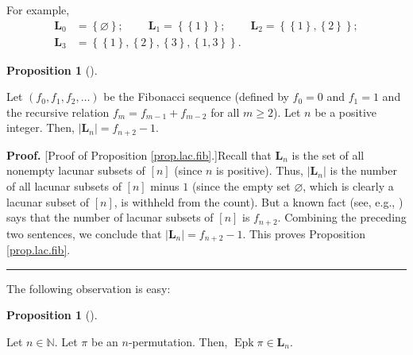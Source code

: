 \documentclass[numbers=enddot,12pt,final,onecolumn,notitlepage]{scrartcl}%
\theoremstyle{definition}
\newtheorem{prop}[theo]{Proposition}
\newenvironment{proposition}[1][]
{\begin{prop}[#1]\begin{leftbar}}
{\end{leftbar}\end{prop}}
\newenvironment{proof}[1][Proof]{\noindent\textbf{#1.} }{\ \rule{0.5em}{0.5em}}
\begin{document}
For example,%
\begin{align*}
\mathbf{L}_{0}  &  =\left\{  \varnothing\right\}
;\ \ \ \ \ \ \ \ \ \ \mathbf{L}_{1}=\left\{  \left\{  1\right\}  \right\}
;\ \ \ \ \ \ \ \ \ \ \mathbf{L}_{2}
=\left\{ \left\{ 1 \right\} , \left\{  2\right\}  \right\}  ;\\
\mathbf{L}_{3}  &  =\left\{  \left\{  1\right\}  ,\left\{  2\right\}
,\left\{  3\right\}  ,\left\{  1,3\right\}  \right\}  .
\end{align*}


\begin{proposition}
\label{prop.lac.fib}Let $\left(  f_{0},f_{1},f_{2},\ldots\right)  $ be the
Fibonacci sequence (defined by $f_{0}=0$ and $f_{1}=1$ and the recursive
relation $f_{m}=f_{m-1}+f_{m-2}$ for all $m\geq2$). Let $n$ be a positive
integer. Then, $\left\vert \mathbf{L}_{n}\right\vert =f_{n+2}-1$.
\end{proposition}

\begin{proof}
[Proof of Proposition \ref{prop.lac.fib}.]Recall that $\mathbf{L}_{n}$ is the
set of all nonempty lacunar subsets of $\left[  n\right]  $ (since $n$ is
positive). Thus, $\left\vert \mathbf{L}_{n}\right\vert $ is the number of all
lacunar subsets of $\left[  n\right]  $ minus $1$ (since the empty set
$\varnothing$, which is clearly a lacunar subset of $\left[  n\right]  $, is
withheld from the count). But a known fact (see, e.g., \cite[Exercise 1.35
\textbf{a.}]{Stanley-EC1}) says that the number of lacunar subsets of $\left[
n\right]  $ is $f_{n+2}$. Combining the preceding two sentences, we conclude
that $\left\vert \mathbf{L}_{n}\right\vert =f_{n+2}-1$. This proves
Proposition \ref{prop.lac.fib}.
\end{proof}

The following observation is easy:

\begin{proposition}
\label{prop.Epk-lac}Let $n\in\mathbb{N}$. Let $\pi$ be an $n$-permutation.
Then, $\operatorname{Epk}\pi\in\mathbf{L}_{n}$.
\end{proposition}
\end{document}
